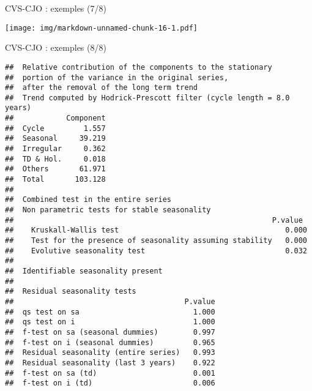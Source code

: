 \documentclass[10pt,xcolor=table,color={dvipsnames,usenames},ignorenonframetext,usepdftitle=false,french]{beamer}
\newenvironment{Shaded}{\begin{snugshade}}{\end{snugshade}}
\newcommand{\DataTypeTok}[1]{\textcolor[rgb]{0.13,0.29,0.53}{#1}}
\newcommand{\DecValTok}[1]{\textcolor[rgb]{0.00,0.00,0.81}{#1}}
\newcommand{\KeywordTok}[1]{\textcolor[rgb]{0.13,0.29,0.53}{\textbf{#1}}}
\newcommand{\NormalTok}[1]{#1}
\newcommand{\OperatorTok}[1]{\textcolor[rgb]{0.81,0.36,0.00}{\textbf{#1}}}
\newcommand{\StringTok}[1]{\textcolor[rgb]{0.31,0.60,0.02}{#1}}
\begin{document}
\begin{frame}[fragile]{CVS-CJO : exemples (7/8)}
\protect\hypertarget{cvs-cjo-exemples-78}{}

\begin{Shaded}
\end{Shaded}

\texttt{[image: img/markdown-unnamed-chunk-16-1.pdf]}

\end{frame}

\begin{frame}[fragile]{CVS-CJO : exemples (8/8)}
\protect\hypertarget{cvs-cjo-exemples-88}{}

\footnotesize

\begin{Shaded}
\end{Shaded}

\begin{verbatim}
##  Relative contribution of the components to the stationary
##  portion of the variance in the original series,
##  after the removal of the long term trend 
##  Trend computed by Hodrick-Prescott filter (cycle length = 8.0 years)
##            Component
##  Cycle         1.557
##  Seasonal     39.219
##  Irregular     0.362
##  TD & Hol.     0.018
##  Others       61.971
##  Total       103.128
## 
##  Combined test in the entire series 
##  Non parametric tests for stable seasonality
##                                                           P.value
##    Kruskall-Wallis test                                      0.000
##    Test for the presence of seasonality assuming stability   0.000
##    Evolutive seasonality test                                0.032
##  
##  Identifiable seasonality present
## 
##  Residual seasonality tests 
##                                       P.value
##  qs test on sa                          1.000
##  qs test on i                           1.000
##  f-test on sa (seasonal dummies)        0.997
##  f-test on i (seasonal dummies)         0.965
##  Residual seasonality (entire series)   0.993
##  Residual seasonality (last 3 years)    0.922
##  f-test on sa (td)                      0.001
##  f-test on i (td)                       0.006
\end{verbatim}

\end{frame}
\end{document}
